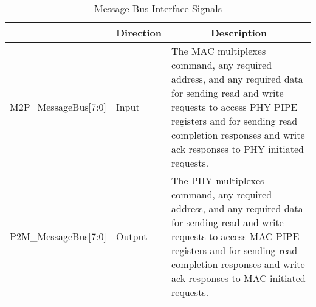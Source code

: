 \begin{table}[H]
    \caption{Message Bus Interface Signals}
    \centering
  \begin{tabular}{ |m{30mm}|m{10mm}|m{60mm}|  }
\hline
\rowcolor{Gray}
\multicolumn{1}{|c|}{\textbf{Name} } 
& \multicolumn{1}{|c|}{\textbf{Direction}} 
& \multicolumn{1}{|c|}{\textbf{Description}}\\
\hline

M2P\_MessageBus[7:0] & Input & The MAC multiplexes command, any
required address, and any required data
for sending read and write requests to
access PHY PIPE registers and for
sending read completion responses and
write ack responses to PHY initiated
requests.  \\ \hline 
P2M\_MessageBus[7:0] & Output & The PHY multiplexes command, any
required address, and any required data
for sending read and write requests to
access MAC PIPE registers and for
sending read completion responses and
write ack responses to MAC initiated
requests.  \\ \hline 

\end{tabular}
\end{table}



